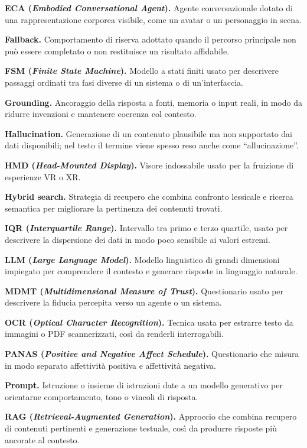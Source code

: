 \textbf{ECA (\emph{Embodied Conversational Agent}).} Agente conversazionale dotato di una rappresentazione corporea visibile, come un avatar o un personaggio in scena.

\textbf{Fallback.} Comportamento di riserva adottato quando il percorso principale non può essere completato o non restituisce un risultato affidabile.

\textbf{FSM (\emph{Finite State Machine}).} Modello a stati finiti usato per descrivere passaggi ordinati tra fasi diverse di un sistema o di un'interfaccia.

\textbf{Grounding.} Ancoraggio della risposta a fonti, memoria o input reali, in modo da ridurre invenzioni e mantenere coerenza col contesto.

\textbf{Hallucination.} Generazione di un contenuto plausibile ma non supportato dai dati disponibili; nel testo il termine viene spesso reso anche come ``allucinazione''.

\textbf{HMD (\emph{Head-Mounted Display}).} Visore indossabile usato per la fruizione di esperienze VR o XR.

\textbf{Hybrid search.} Strategia di recupero che combina confronto lessicale e ricerca semantica per migliorare la pertinenza dei contenuti trovati.

\textbf{IQR (\emph{Interquartile Range}).} Intervallo tra primo e terzo quartile, usato per descrivere la dispersione dei dati in modo poco sensibile ai valori estremi.

\textbf{LLM (\emph{Large Language Model}).} Modello linguistico di grandi dimensioni impiegato per comprendere il contesto e generare risposte in linguaggio naturale.

\textbf{MDMT (\emph{Multidimensional Measure of Trust}).} Questionario usato per descrivere la fiducia percepita verso un agente o un sistema.

\textbf{OCR (\emph{Optical Character Recognition}).} Tecnica usata per estrarre testo da immagini o PDF scannerizzati, così da renderli interrogabili.

\textbf{PANAS (\emph{Positive and Negative Affect Schedule}).} Questionario che misura in modo separato affettività positiva e affettività negativa.

\textbf{Prompt.} Istruzione o insieme di istruzioni date a un modello generativo per orientarne comportamento, tono o vincoli di risposta.

\textbf{RAG (\emph{Retrieval-Augmented Generation}).} Approccio che combina recupero di contenuti pertinenti e generazione testuale, così da produrre risposte più ancorate al contesto.

